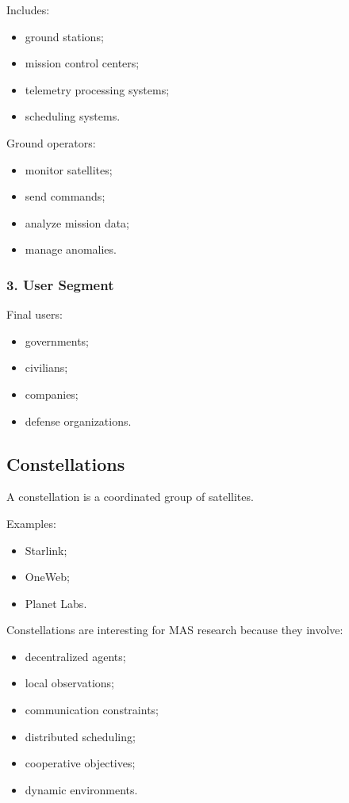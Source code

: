 \documentclass[10pt,a4paper,twocolumn]{article}
\begin{document}
Includes:
\begin{itemize}
    \item ground stations;
    \item mission control centers;
    \item telemetry processing systems;
    \item scheduling systems.
\end{itemize}

Ground operators:
\begin{itemize}
    \item monitor satellites;
    \item send commands;
    \item analyze mission data;
    \item manage anomalies.
\end{itemize}


\subsubsection*{3. User Segment}

Final users:
\begin{itemize}
    \item governments;
    \item civilians;
    \item companies;
    \item defense organizations.
\end{itemize}


\subsection{Constellations}

A constellation is a coordinated group of satellites.

Examples:
\begin{itemize}
    \item Starlink;
    \item OneWeb;
    \item Planet Labs.
\end{itemize}

Constellations are interesting for MAS research because they involve:
\begin{itemize}
    \item decentralized agents;
    \item local observations;
    \item communication constraints;
    \item distributed scheduling;
    \item cooperative objectives;
    \item dynamic environments.
\end{itemize}
\end{document}
